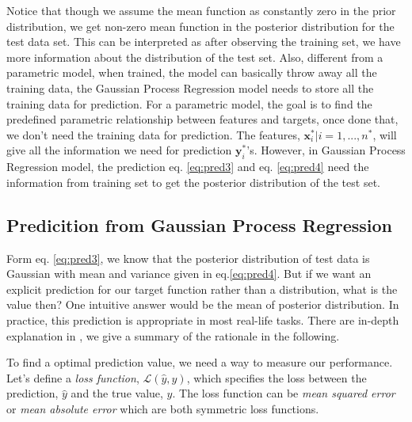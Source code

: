 \documentclass[11pt,a4paper]{article}
\theoremstyle{definition}
\numberwithin{equation}{section}
\let\vec\mathbf
\begin{document}
Notice that though we assume the mean function as constantly zero in the prior distribution, we get non-zero mean function in the posterior distribution for the test data set. This can be interpreted as after observing the training set, we have more information about the distribution of the test set. Also, different from a parametric model, when trained, the model can basically throw away all the training data, the Gaussian Process Regression model needs to store all the training data for prediction. For a parametric model, the goal is to find the predefined parametric relationship between features and targets, once done that, we don't need the training data for prediction. The features, ${\vec x^*_i | i=1,...,n^*}$, will give all the information we need for prediction $\vec y^*_i$'s. However, in Gaussian Process Regression model, the prediction eq. \ref{eq:pred3} and eq. \ref{eq:pred4} need the information from training set to get the posterior distribution of the test set.

\subsection{Predicition from Gaussian Process Regression}\label{sec:decision_theory}
Form eq. \ref{eq:pred3}, we know that the posterior distribution of test data is Gaussian with mean and variance given in eq.\ref{eq:pred4}. But if we want an explicit prediction for our target function rather than a distribution, what is the value then? One intuitive answer would be the mean of posterior distribution. In practice, this prediction is appropriate in most real-life tasks. There are in-depth explanation in \cite[Rasmussen and Williams, sec 2.4]{RandW}, we give a summary of the rationale in the following.

To find a optimal prediction value, we need a way to measure our performance. Let's define a \textit{loss function}, $\mathcal{L}(\hat y,y)$, which specifies the loss between the prediction, $\hat y$ and the true value, $y$. The loss function can be \textit{mean squared error} or \textit{mean absolute error} which are both symmetric loss functions.
\end{document}
